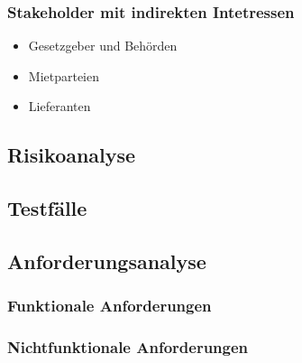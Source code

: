 \subsubsection{Stakeholder mit indirekten Intetressen}

\begin{itemize}
    \item Gesetzgeber und Behörden
    \item Mietparteien
    \item Lieferanten
\end{itemize}

\subsection{Risikoanalyse}

\subsection{Testfälle}


\subsection{Anforderungsanalyse}
\subsubsection{Funktionale Anforderungen}
\subsubsection{Nichtfunktionale Anforderungen}
